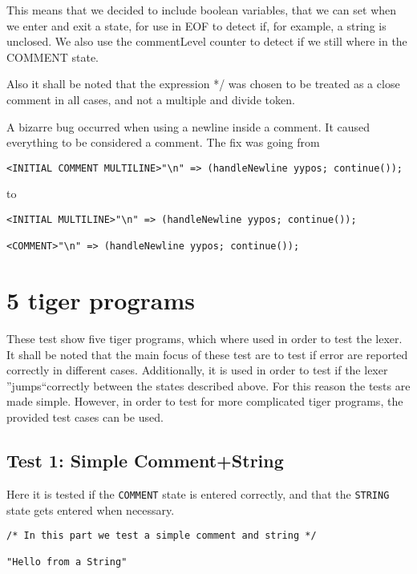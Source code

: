 \documentclass{article}
\begin{document}
This means that we decided to include boolean variables, that we can set when we enter and exit a state, for use in EOF to detect if, for example, a string is unclosed. We also use the commentLevel counter to detect if we still where in the COMMENT state.

Also it shall be noted that the expression */ was chosen to be treated as a close comment in all cases, and not a multiple and divide token.


A bizarre bug occurred when using a newline inside a comment. It caused everything to be considered a comment. The fix was going from
\begin{lstlisting}[frame=single]
<INITIAL COMMENT MULTILINE>"\n" => (handleNewline yypos; continue());
\end{lstlisting}
to
\begin{lstlisting}[frame=single]
<INITIAL MULTILINE>"\n" => (handleNewline yypos; continue());

<COMMENT>"\n" => (handleNewline yypos; continue());
\end{lstlisting}

\section{5 tiger programs}
These test show five tiger programs, which where used in order to test the lexer. It shall be noted that the main focus of these test are to test if error are reported correctly in different cases. Additionally, it is used in order to test if the lexer ''jumps``correctly between the states described above. For this reason the tests are made simple. However, in order to test for more complicated tiger programs, the provided test cases can be used.  

\subsection{Test 1: Simple Comment+String}
Here it is tested if the \texttt{COMMENT} state is entered correctly, and that the \texttt{STRING} state gets entered when necessary.

\begin{lstlisting}[frame=single]
/* In this part we test a simple comment and string */

"Hello from a String"
\end{lstlisting}
\end{document}
